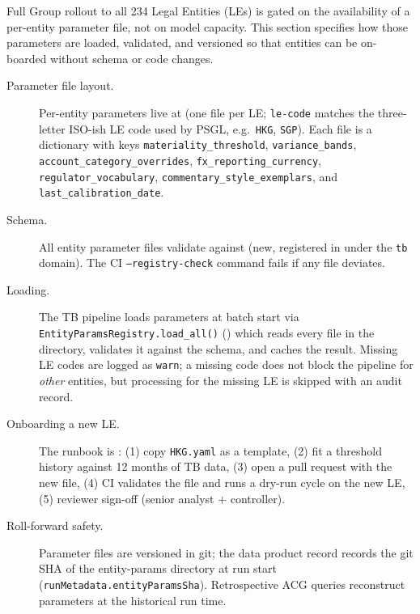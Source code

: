 Full Group rollout to all 234 Legal Entities (LEs) is gated on the
availability of a per-entity parameter file, not on model capacity.
This section specifies how those parameters are loaded, validated,
and versioned so that entities can be on-boarded without schema or
code changes.

\begin{description}
  \item[Parameter file layout.] Per-entity parameters live at
        (one file per LE; \texttt{le-code} matches the three-letter
        ISO-ish LE code used by PSGL, e.g.\ \texttt{HKG},
        \texttt{SGP}). Each file is a dictionary with keys
        \texttt{materiality\_threshold}, \texttt{variance\_bands},
        \texttt{account\_category\_overrides},
        \texttt{fx\_reporting\_currency},
        \texttt{regulator\_vocabulary},
        \texttt{commentary\_style\_exemplars}, and
        \texttt{last\_calibration\_date}.
  \item[Schema.] All entity parameter files validate against
         (new,
        registered in  under the
        \texttt{tb} domain). The CI \texttt{--registry-check}
        command fails if any file deviates.
  \item[Loading.] The TB pipeline loads parameters at batch start
        via \texttt{EntityParamsRegistry.load\_all()}
        () which reads every file in
        the directory, validates it against the schema, and caches
        the result. Missing LE codes are logged as
        \texttt{warn}; a missing code does not block the pipeline
        for \emph{other} entities, but processing for the missing
        LE is skipped with an audit record.
  \item[Onboarding a new LE.] The runbook is
        : (1) copy
        \texttt{HKG.yaml} as a template, (2) fit a threshold
        history against 12 months of TB data, (3) open a pull
        request with the new file, (4) CI validates the file and
        runs a dry-run cycle on the new LE, (5) reviewer sign-off
        (senior analyst + controller).
  \item[Roll-forward safety.] Parameter files are versioned in
        git; the data product record records the git SHA of the
        entity-params directory at run start
        (\texttt{runMetadata.entityParamsSha}). Retrospective
        ACG queries reconstruct parameters at the historical run
        time.
\end{description}

